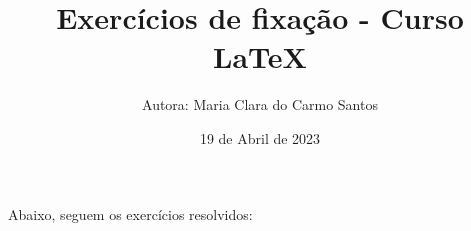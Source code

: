 \documentclass[a4paper, 12pt]{article}
\title{Exercícios de fixação - Curso LaTeX}
\author{Autora: Maria Clara do Carmo Santos}
\date{19 de Abril de 2023}
\begin{document}
\maketitle

Abaixo, seguem os exercícios resolvidos:
\end{document}
